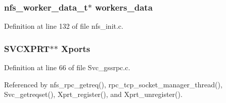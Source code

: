 \subsubsection{\setlength{\rightskip}{0pt plus 5cm}nfs\_\-worker\_\-data\_\-t$\ast$ {\bf workers\_\-data}}\label{nfs__rpc__dispatcher__thread_8c_a3}




Definition at line 132 of file nfs\_\-init.c.
\subsubsection{\setlength{\rightskip}{0pt plus 5cm}SVCXPRT$\ast$$\ast$ {\bf Xports}}\label{nfs__rpc__dispatcher__thread_8c_a5}




Definition at line 66 of file Svc\_\-gssrpc.c.

Referenced by nfs\_\-rpc\_\-getreq(), rpc\_\-tcp\_\-socket\_\-manager\_\-thread(), Svc\_\-getreqset(), Xprt\_\-register(), and Xprt\_\-unregister().